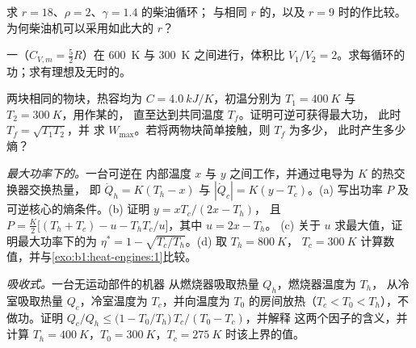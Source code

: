 \begin{exercise}[$\star\star$]\label{exo:b1:heat-engines:7}
求 $r = 18$、$\rho = 2$、$\gamma = 1.4$ 的柴油循环；
与相同 $r$ 的，以及
$r = 9$ 时的作比较。为何柴油机可以采用如此大的 $r$？
\end{exercise}

\begin{exercise}[$\star\star$]\label{exo:b1:heat-engines:8}
一（$C_{V,m} = \tfrac52R$）在
\qty{600}{K} 与 \qty{300}{K} 之间进行，体积比 $V_1/V_2 = 2$。求每循环的
功；求有理想及无时的。
\end{exercise}

\begin{exercise}[$\star\star$]\label{exo:b1:heat-engines:9}
两块相同的物块，热容均为 $C = \qty{4.0}{kJ/K}$，初温分别为 $T_1 =
\qty{400}{K}$ 与 $T_2 = \qty{300}{K}$，用作某的，
直至达到共同温度 $T_f$。证明可逆可获得最大功，
此时 $T_f = \sqrt{T_1T_2}$，并
求 $W_{\max}$。若将两物块简单接触，则 $T_f$ 为多少，
此时产生多少熵？
\end{exercise}

\begin{exercise}[$\star\star\star$]\label{exo:b1:heat-engines:10}
\emph{最大功率下的。}一台可逆在
内部温度 $x$ 与 $y$ 之间工作，并通过电导为 $K$ 的热交换器交换热量，
即 $\dot Q_h = K(T_h - x)$ 与
$|\dot Q_c| = K(y - T_c)$。(a) 写出功率 $P$ 及
可逆核心的熵条件。(b) 证明 $y = xT_c/(2x - T_h)$，
且 $P = \frac{K}{2}\bigl[(T_h + T_c) - u - T_hT_c/u\bigr]$，其中 $u = 2x - T_h$。
(c) 关于 $u$ 求最大值，证明最大功率下的为
$\eta^\ast = 1 - \sqrt{T_c/T_h}$。(d) 取 $T_h = \qty{800}{K}$，
$T_c = \qty{300}{K}$ 计算数值，并与\cref{exo:b1:heat-engines:1}比较。
\end{exercise}

\begin{exercise}[$\star\star\star$]\label{exo:b1:heat-engines:11}
\emph{吸收式。}一台无运动部件的机器
从燃烧器吸取热量 $Q_h$，燃烧器温度为 $T_h$，
从冷室吸取热量 $Q_c$，冷室温度为 $T_c$，并向温度为 $T_0$ 的房间放热（$T_c < T_0 <
T_h$），不做功。证明
$Q_c/Q_h \leq \bigl(1 - T_0/T_h\bigr)\,T_c/(T_0 - T_c)$，并解释
这两个因子的含义，并计算 $T_h = \qty{400}{K}$，$T_0 =
\qty{300}{K}$，$T_c = \qty{275}{K}$ 时该上界的值。
\end{exercise}

